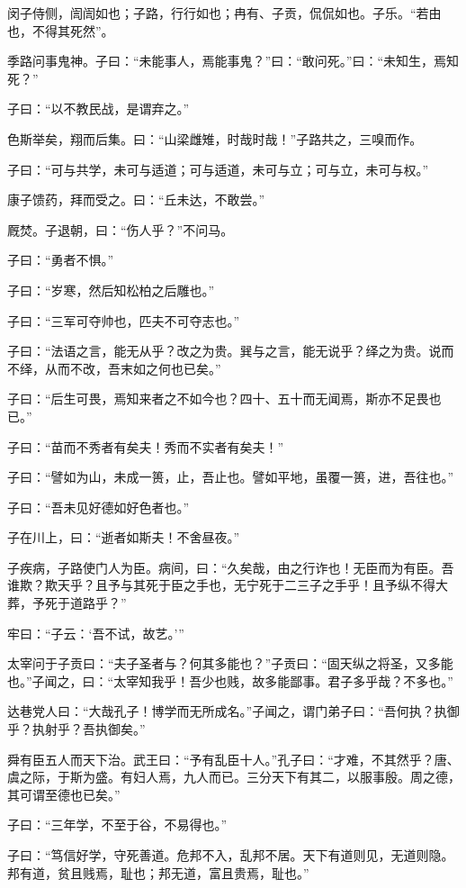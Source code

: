 \documentclass[a5paper]{ctexbook}
\begin{document}
    闵子侍侧，訚訚如也；子路，行行如也；冉有、子贡，侃侃如也。子乐。“若由也，不得其死然”。

    季路问事鬼神。子曰：“未能事人，焉能事鬼？”曰：“敢问死。”曰：“未知生，焉知死？”

    子曰：“以不教民战，是谓弃之。”

    色斯举矣，翔而后集。曰：“山梁雌雉，时哉时哉！”子路共之，三嗅而作。

    子曰：“可与共学，未可与适道；可与适道，未可与立；可与立，未可与权。”

    康子馈药，拜而受之。曰：“丘未达，不敢尝。”
    
    厩焚。子退朝，曰：“伤人乎？”不问马。

    子曰：“勇者不惧。”

    子曰：“岁寒，然后知松柏之后雕也。”

    子曰：“三军可夺帅也，匹夫不可夺志也。”

    子曰：“法语之言，能无从乎？改之为贵。巽与之言，能无说乎？绎之为贵。说而不绎，从而不改，吾末如之何也已矣。”

    子曰：“后生可畏，焉知来者之不如今也？四十、五十而无闻焉，斯亦不足畏也已。”

    子曰：“苗而不秀者有矣夫！秀而不实者有矣夫！”

    子曰：“譬如为山，未成一篑，止，吾止也。譬如平地，虽覆一篑，进，吾往也。”

    子曰：“吾未见好德如好色者也。”

    子在川上，曰：“逝者如斯夫！不舍昼夜。”

    子疾病，子路使门人为臣。病间，曰：“久矣哉，由之行诈也！无臣而为有臣。吾谁欺？欺天乎？且予与其死于臣之手也，无宁死于二三子之手乎！且予纵不得大葬，予死于道路乎？”

    牢曰：“子云：‘吾不试，故艺。’”

    太宰问于子贡曰：“夫子圣者与？何其多能也？”子贡曰：“固天纵之将圣，又多能也。”子闻之，曰：“太宰知我乎！吾少也贱，故多能鄙事。君子多乎哉？不多也。”

    达巷党人曰：“大哉孔子！博学而无所成名。”子闻之，谓门弟子曰：“吾何执？执御乎？执射乎？吾执御矣。”

    舜有臣五人而天下治。武王曰：“予有乱臣十人。”孔子曰：“才难，不其然乎？唐、虞之际，于斯为盛。有妇人焉，九人而已。三分天下有其二，以服事殷。周之德，其可谓至德也已矣。”

    

    子曰：“三年学，不至于谷，不易得也。”

    子曰：“笃信好学，守死善道。危邦不入，乱邦不居。天下有道则见，无道则隐。邦有道，贫且贱焉，耻也；邦无道，富且贵焉，耻也。”
\end{document}
